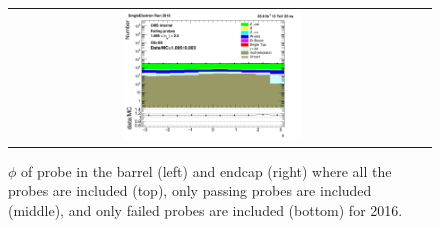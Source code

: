 \begin{figure}[htp]
\begin{center}
\begin{tabular}{cc}
      \includegraphics[width=0.45\textwidth]{figures/Zprime/2016/ScaleFactor/SameSign/nominal/stack_phi_Endcap_fail_PUW.png}
    \end{tabular}
    \caption{$\phi$ of probe in the barrel (left) and endcap (right) where all the probes are included (top), only passing probes are included (middle), and only failed probes are included (bottom) for 2016.}
    \label{fig:SS_nominal_phi_2016}
  \end{center}
\end{figure}
